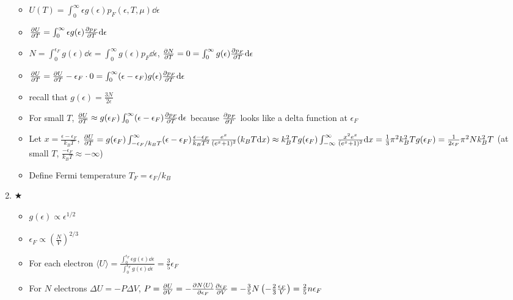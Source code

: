 \documentclass{article}
\theoremstyle{remark}
\theoremstyle{remark}
\newcommand{\myref}[1]{\hyperref[back:#1]{$\bigstar$}\label{#1}}
\begin{document}
\begin{enumerate}
\begin{center}
        \end{center}\begin{itemize}
            \item $U(T) = \int_0^\infty\epsilon g(\epsilon)p_F(\epsilon,T,\mu)\dd\epsilon$
            \item $\pdv{U}{T}=\int_0^\infty\epsilon g(\epsilon)\pdv{p_F}{T}\dd\epsilon$
            \item $N = \int_0^{\epsilon_F}g(\epsilon)\dd\epsilon = \int_0^\infty g(\epsilon)p_F\dd\epsilon$, $\pdv{N}{T} = 0 = \int_0^\infty g(\epsilon)\pdv{p_F}{T}\dd\epsilon$
            \item $\pdv{U}{T} = \pdv{U}{T}-\epsilon_F\cdot 0 = \int_0^\infty(\epsilon-\epsilon_F) g(\epsilon)\pdv{p_F}{T}\dd\epsilon$
            \item recall that $g(\epsilon)=\frac{3N}{2\epsilon}$
            \item For small $T$, $\pdv{U}{T} \approx g(\epsilon_F)\int_0^\infty(\epsilon-\epsilon_F)\pdv{p_F}{T}\dd\epsilon$ because $\pdv{p_F}{T}$ looks like a delta function at $\epsilon_F$
            \item Let $x=\frac{\epsilon-\epsilon_F}{k_BT}$, $\pdv{U}{T} = g(\epsilon_F)\int_{-\epsilon_F/k_BT}^\infty (\epsilon-\epsilon_F)\frac{\epsilon-\epsilon_F}{k_BT^2}\frac{e^x}{(e^x+1)^2}(k_BT\dd x)\approx k_B^2Tg(\epsilon_F)\int_{-\infty}^\infty\frac{x^2e^x}{(e^x+1)^2}\dd x = \frac{1}{3}\pi^2k_B^2Tg(\epsilon_F) = \frac{1}{2\epsilon_F}\pi^2Nk_B^2 T$ (at small $T$, $\frac{-\epsilon_F}{k_B T}\approx-\infty$)
            \item Define Fermi temperature $T_F = \epsilon_F/k_B$
        \end{itemize}
    \item \myref{thm:electron_pressure}\begin{itemize}
        \item $g(\epsilon)\propto\epsilon^{1/2}$
        \item $\epsilon_F\propto\left(\frac{N}{V}\right)^{2/3}$
        \item For each electron $\langle U\rangle=\frac{\int_0^{\epsilon_F}\epsilon g(\epsilon)\dd\epsilon}{\int_0^{\epsilon_F}g(\epsilon)\dd\epsilon} = \frac{3}{5}\epsilon_F$
        \item For $N$ electrons $\Delta U = -P\Delta V$, $P = \pdv{U}{V}=-\pdv{N\langle U\rangle}{\epsilon_F}\pdv{\epsilon_F}{V} = -\frac{3}{5}N\left(-\frac{2}{3}\frac{\epsilon_F}{V}\right) = \frac{2}{5}n\epsilon_F$
    \end{itemize}
\end{enumerate}
\end{document}
